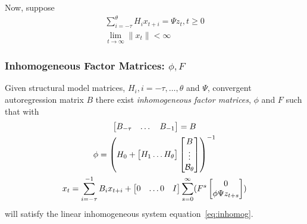 \documentclass{elsart}
\begin{document}
Now, suppose
\begin{gather}\label{eq:inhomog}
\sum_{i= - \tau}^\theta{ H_i  x_{ t + i } }= \Psi{} z_{t}, t \geq0\\
\lim_{ t \rightarrow\infty} \|x_t\|   < \infty
\end{gather}





\subsubsection{Inhomogeneous Factor Matrices: $\phi, F$}
\label{sec:inhomofactor}
\label{sec:inhomog}

\begin{thrm}\label{inHomo}
Given structural model matrices, $H_i, i=-\tau,\ldots,\theta$ and $\Psi$,
 convergent autoregression matrix $B$
there exist 
{\em inhomogeneous factor matrices}, $\phi$ and $F$ such that with 
\begin{gather}
\begin{bmatrix}
  B_{-\tau}&\dots&B_{-1}
\end{bmatrix}=B\\
 \phi= \left (  H_0 +   \begin{bmatrix}
    H_{1}\ldots H_\theta
  \end{bmatrix} \begin{bmatrix}
      B\\\vdots\\\ugB{\theta}
    \end{bmatrix} \right )^{-1} \\
 x_t=\sum_{i=-\tau}^{-1} B_i x_{t+i} + 
  \begin{bmatrix}
  0&\dots 0&I
  \end{bmatrix}
\sum_{s=0}^\infty%
 (F^{s} 
\begin{bmatrix}
0\\
\phi\Psi{}z_{t+s}  
\end{bmatrix}) 
\end{gather}
will satisfy 
the linear inhomogeneous system equation~\ref{eq:inhomog}.
\end{thrm}
\end{document}
